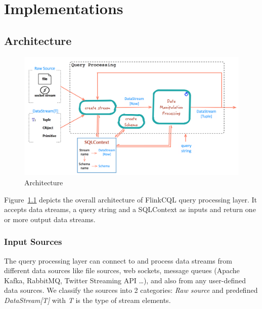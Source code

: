 
\chapter{Implementations}

\ifpdf
    \graphicspath{{Chapter5/Figs/Raster/}{Chapter5/Figs/PDF/}{Chapter5/Figs/}}
\else
    \graphicspath{{Chapter5/Figs/Vector/}{Chapter5/Figs/}}
\fi

\section{Architecture}

\begin{figure}[h!] 
\centering    
\includegraphics[width=1\textwidth]{Architecture}
\caption{Architecture}
\label{fig:Architecture}
\end{figure}


Figure~\ref{fig:Architecture} depicts the overall architecture of FlinkCQL query processing layer. It accepts data streams, a query string and a SQLContext as inputs and return one or more output data streams.
\subsection{Input Sources}
The query processing layer can connect to and process data streams from different data sources like file sources, web sockets, message queues (Apache Kafka, RabbitMQ, Twitter Streaming API …), and also from any user-defined data sources. We classify the sources into 2 categories: \textit{Raw source} and predefined \textit{DataStream[T]} with \textit{T} is the type of stream elements.

